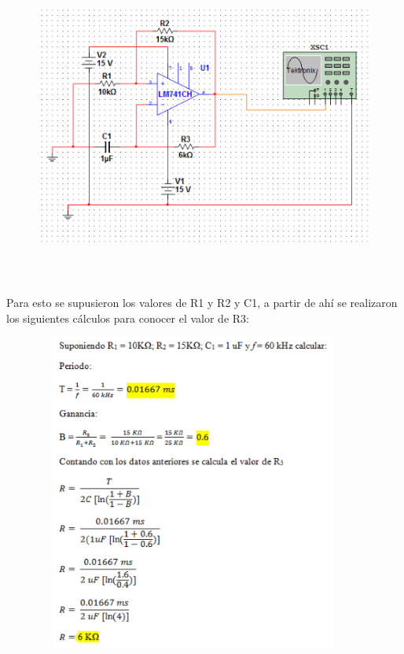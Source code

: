 \documentclass[12pt]{article}
\begin{document}
\begin{figure}[H]
	\begin{Center}
		\includegraphics[width=5.81in,height=4.12in]{./media/image3.png}
	\end{Center}
\end{figure}


\newpage
\par

\setlength{\parskip}{15.0pt}
{\fontsize{11pt}{13.2pt}\selectfont \textcolor[HTML]{656565}{Para esto se supusieron los valores de R1 y R2 y C1, a partir de ahí se realizaron los siguientes cálculos para conocer el valor de R3:}\par}\par




\begin{figure}[H]
	\begin{Center}
		\includegraphics[width=4.1in,height=4.11in]{./media/image4.png}
	\end{Center}
\end{figure}
\end{document}
